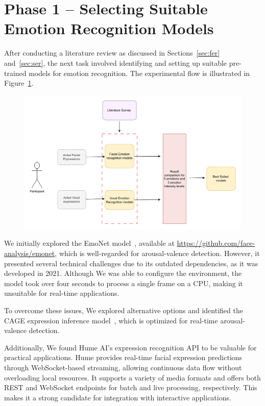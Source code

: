 \section{Phase 1 – Selecting Suitable Emotion Recognition Models}\label{sec:experiment-phase1}

After conducting a literature review as discussed in Sections~\ref{sec:fer} and~\ref{sec:ser}, the next task involved identifying and setting up suitable pre-trained models for emotion recognition. The experimental flow is illustrated in Figure~\ref{fig:phase1}. 

\begin{figure}[h]
    \centering
    \includegraphics[width=1\textwidth]{img/chapter_03/Phase1.jpg}
    \label{fig:phase1}
\end{figure}

We initially explored the EmoNet model~\citep{toisoul2021estimation}, available at \url{https://github.com/face-analysis/emonet}, which is well-regarded for arousal-valence detection. However, it presented several technical challenges due to its outdated dependencies, as it was developed in 2021. Although We was able to configure the environment, the model took over four seconds to process a single frame on a CPU, making it unsuitable for real-time applications.

To overcome these issues, We explored alternative options and identified the CAGE expression inference model~\citep{wagner2024cage}, which is optimized for real-time arousal-valence detection. 

Additionally, We found Hume AI’s expression recognition API to be valuable for practical applications. Hume provides real-time facial expression predictions through WebSocket-based streaming, allowing continuous data flow without overloading local resources. It supports a variety of media formats and offers both REST and WebSocket endpoints for batch and live processing, respectively. This makes it a strong candidate for integration with interactive applications.

